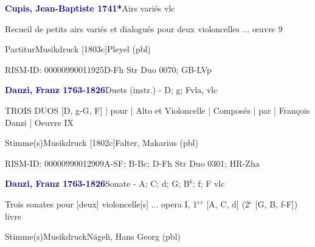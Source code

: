 \documentclass[twocolumn, 12pt]{book}
\begin{document}
\par \vspace{16pt} \textcolor{darkblue}{\textbf{Cupis, Jean-Baptiste  1741*}}\hfillplus{\textbf{[263]}}\newline Airs variés vlc
\par \begin{itshape}Recueil de petits airs variés et dialogués pour deux violoncelles ... œuvre 9\end{itshape} 
\par \textcolor{darkblue}{}  Partitur\newline Musikdruck  [1803c]\newline Pleyel  (pbl)
\par RISM-ID: 00000990011925\newline D-Fh  Str Duo 0070; GB-LVp
\par \vspace{16pt} \textcolor{darkblue}{\textbf{Danzi, Franz  1763-1826}}\hfillplus{\textbf{[264]}}\newline Duets (instr.) - D; g; F\newline vla, vlc
\par \begin{itshape}TROIS DUOS [D, g-G, F] | pour | Alto et Violoncelle | Composés | par | François Danzi |  Oeuvre IX\end{itshape} 
\par \textcolor{darkblue}{}  Stimme(s)\newline Musikdruck  [1802c]\newline Falter, Makarius  (pbl)
\par RISM-ID: 00000990012909\newline A-SF; B-Bc; D-Fh  Str Duo 0301; HR-Zha
\par \vspace{16pt} \textcolor{darkblue}{\textbf{Danzi, Franz  1763-1826}}\hfillplus{\textbf{[265]}}\newline Sonate - A; C; d; G; B$^b$; f; F vlc
\par \begin{itshape}Trois sonates pour [deux] violoncelle[s] ... opera I, 1$^e$$^r$ [A, C, d] (2$^e$ [G, B, f-F]) livre\end{itshape} 
\par \textcolor{darkblue}{}  Stimme(s)\newline Musikdruck\newline Nägeli, Hans Georg  (pbl)
\end{document}
